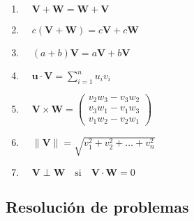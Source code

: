 \begin{enumerate}
    \item  {} $\quad \mathbf{V} + \mathbf{W} = \mathbf{W} + \mathbf{V} $\\
\item  {} $\quad c(\mathbf{V} + \mathbf{W}) = c\mathbf{V} + c\mathbf{W}$ \\
\item  {} $\quad (a + b)\mathbf{V} = a\mathbf{V} + b\mathbf{V}$ \\
\item  {}$ \quad \mathbf{u} \cdot \mathbf{V} = \sum_{i=1}^{n} u_iv_i $\\
\item  {} $\quad \mathbf{V} \times \mathbf{W} = \begin{pmatrix} v_2 w_3 - v_3 w_2 \\ v_3 w_1 - v_1 w_3 \\ v_1 w_2 - v_2 w_1 \end{pmatrix} $\\
\item  {} $\quad \|\mathbf{V}\| = \sqrt{v_1^2 + v_2^2 + \ldots + v_n^2}$ \\
\item   {} $\quad \mathbf{V} \perp \mathbf{W} \quad \text{si} \quad \mathbf{V} \cdot \mathbf{W} = 0$
\end{enumerate}


\subsection{Resolución de problemas}

